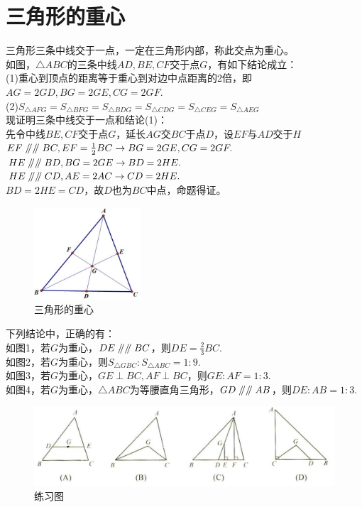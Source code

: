 \documentclass{ecnuthesis}
\newcommand\px{\mathrel{/\mkern-5mu/}}  %
\begin{document}
\section{三角形的重心}
\begin{knowledge}
    三角形三条中线交于一点，一定在三角形内部，称此交点为重心。\\
    如图，$\triangle ABC$的三条中线$AD,BE,CF$交于点$G$，有如下结论成立：\\
    (1)重心到顶点的距离等于重心到对边中点距离的2倍，即$AG=2GD,BG=2GE,CG=2GF$. \\
    (2)$S_{\triangle AFG}=S_{\triangle BFG}=S_{\triangle BDG}=S_{\triangle CDG}=S_{\triangle CEG}=S_{\triangle AEG}$ \\
    现证明三条中线交于一点和结论(1)： \\
    先令中线$BE,CF$交于点$G$，延长$AG$交$BC$于点$D$，设$EF$与$AD$交于$H$\\
    $EF\px \px BC,EF=\frac{1}{2}BC \rightarrow BG=2GE,CG=2GF.$ \\
    $HE\px \px BD,BG=2GE \rightarrow BD=2HE.$ \\
    $HE\px \px CD,AE=2AC \rightarrow CD=2HE.$ \\
    $BD=2HE=CD$，故$D$也为$BC$中点，命题得证。\\
\end{knowledge}
\begin{figure}[H]
\centering
\includegraphics[width=4cm]{picture/809.png}
\caption{三角形的重心}
\end{figure}
\begin{problem}
    下列结论中，正确的有：\\
    如图1，若$G$为重心，$DE\px \px BC$，则$DE=\frac{2}{3}BC$. \\
    如图2，若$G$为重心，则$S_{\triangle GBC}:S_{\triangle ABC}=1:9$. \\
    如图3，若$G$为重心，$GE\perp BC,AF\perp BC$，则$GE:AF=1:3$. \\
    如图4，若$G$为重心，$\triangle ABC$为等腰直角三角形，$GD\px \px AB$，则$DE:AB=1:3$. \\
\end{problem}
\begin{figure}[H]
\centering
\includegraphics[width=12cm]{picture/822.png}
\caption{练习图}
\end{figure}
\end{document}
